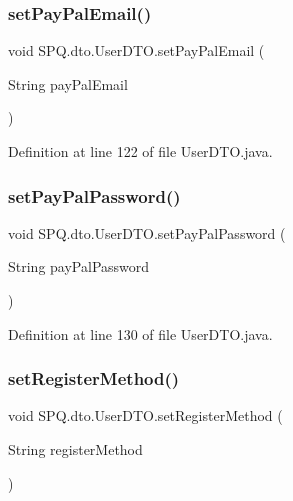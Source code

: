\subsubsection{\texorpdfstring{set\+Pay\+Pal\+Email()}{setPayPalEmail()}}
{\footnotesize\ttfamily void S\+P\+Q.\+dto.\+User\+D\+T\+O.\+set\+Pay\+Pal\+Email (\begin{DoxyParamCaption}\item[{String}]{pay\+Pal\+Email }\end{DoxyParamCaption})}



Definition at line 122 of file User\+D\+T\+O.\+java.

\mbox{\label{class_s_p_q_1_1dto_1_1_user_d_t_o_afe549d85cf389f5f7aa90eb8a0f1a6d8}} 
\subsubsection{\texorpdfstring{set\+Pay\+Pal\+Password()}{setPayPalPassword()}}
{\footnotesize\ttfamily void S\+P\+Q.\+dto.\+User\+D\+T\+O.\+set\+Pay\+Pal\+Password (\begin{DoxyParamCaption}\item[{String}]{pay\+Pal\+Password }\end{DoxyParamCaption})}



Definition at line 130 of file User\+D\+T\+O.\+java.

\mbox{\label{class_s_p_q_1_1dto_1_1_user_d_t_o_a8e4fb216f49f13c196598119a15556ea}} 
\subsubsection{\texorpdfstring{set\+Register\+Method()}{setRegisterMethod()}}
{\footnotesize\ttfamily void S\+P\+Q.\+dto.\+User\+D\+T\+O.\+set\+Register\+Method (\begin{DoxyParamCaption}\item[{String}]{register\+Method }\end{DoxyParamCaption})}



